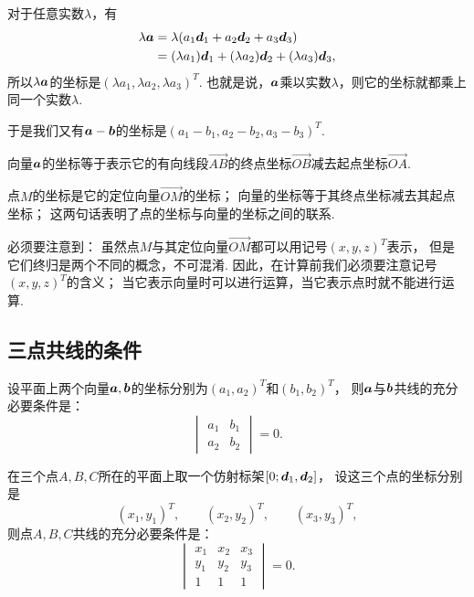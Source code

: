 对于任意实数\(\lambda\)，有\begin{align*}
	\lambda \boldsymbol{a}
	&= \lambda (a_1 \boldsymbol{d}_1 + a_2 \boldsymbol{d}_2 + a_3 \boldsymbol{d}_3) \\
	&= (\lambda a_1) \boldsymbol{d}_1 + (\lambda a_2) \boldsymbol{d}_2 + (\lambda a_3) \boldsymbol{d}_3,
\end{align*}
所以\(\lambda \boldsymbol{a}\)的坐标是\((\lambda a_1,\lambda a_2,\lambda a_3)^T\).
也就是说，\(\boldsymbol{a}\)乘以实数\(\lambda\)，则它的坐标就都乘上同一个实数\(\lambda\).

于是我们又有\(\boldsymbol{a}-\boldsymbol{b}\)的坐标是\((a_1-b_1,a_2-b_2,a_3-b_3)^T\).

\begin{theorem}
向量\(\boldsymbol{a}\)的坐标等于表示它的有向线段\(\vec{AB}\)的终点坐标\(\vec{OB}\)减去起点坐标\(\vec{OA}\).
\end{theorem}

点\(M\)的坐标是它的定位向量\(\vec{OM}\)的坐标；
向量的坐标等于其终点坐标减去其起点坐标；
这两句话表明了点的坐标与向量的坐标之间的联系.

必须要注意到：
虽然点\(M\)与其定位向量\(\vec{OM}\)都可以用记号\((x,y,z)^T\)表示，
但是它们终归是两个不同的概念，不可混淆.
因此，在计算前我们必须要注意记号\((x,y,z)^T\)的含义；
当它表示向量时可以进行运算，当它表示点时就不能进行运算.

\subsection{三点共线的条件}
\begin{theorem}\label{theorem:解析几何.平面上两向量共线的充分必要条件}
设平面上两个向量\(\boldsymbol{a},\boldsymbol{b}\)的坐标分别为\((a_1,a_2)^T\)和\((b_1,b_2)^T\)，
则\(\boldsymbol{a}\)与\(\boldsymbol{b}\)共线的充分必要条件是：\begin{equation*}
\begin{vmatrix}
	a_1 & b_1 \\
	a_2 & b_2
\end{vmatrix} = 0.
\end{equation*}
\end{theorem}

\begin{theorem}\label{theorem:解析几何.平面上三点共线的充分必要条件}
在三个点\(A,B,C\)所在的平面上取一个仿射标架\([0;\boldsymbol{d}_1,\boldsymbol{d}_2]\)，
设这三个点的坐标分别是\begin{equation*}
	(x_1,y_1)^T, \qquad
	(x_2,y_2)^T, \qquad
	(x_3,y_3)^T,
\end{equation*}
则点\(A,B,C\)共线的充分必要条件是：\begin{equation*}
\begin{vmatrix}
	x_1 & x_2 & x_3 \\
	y_1 & y_2 & y_3 \\
	1 & 1 & 1
\end{vmatrix} = 0.
\end{equation*}
\end{theorem}

